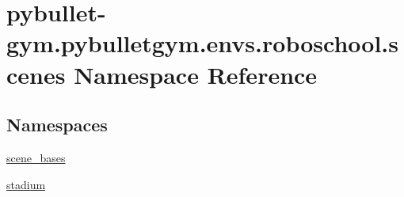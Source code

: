 \hypertarget{namespacepybullet-gym_1_1pybulletgym_1_1envs_1_1roboschool_1_1scenes}{}\section{pybullet-\/gym.pybulletgym.\+envs.\+roboschool.\+scenes Namespace Reference}
\label{namespacepybullet-gym_1_1pybulletgym_1_1envs_1_1roboschool_1_1scenes}
\subsection*{Namespaces}
\begin{DoxyCompactItemize}
\item 
 \hyperlink{namespacepybullet-gym_1_1pybulletgym_1_1envs_1_1roboschool_1_1scenes_1_1scene__bases}{scene\+\_\+bases}
\item 
 \hyperlink{namespacepybullet-gym_1_1pybulletgym_1_1envs_1_1roboschool_1_1scenes_1_1stadium}{stadium}
\end{DoxyCompactItemize}
